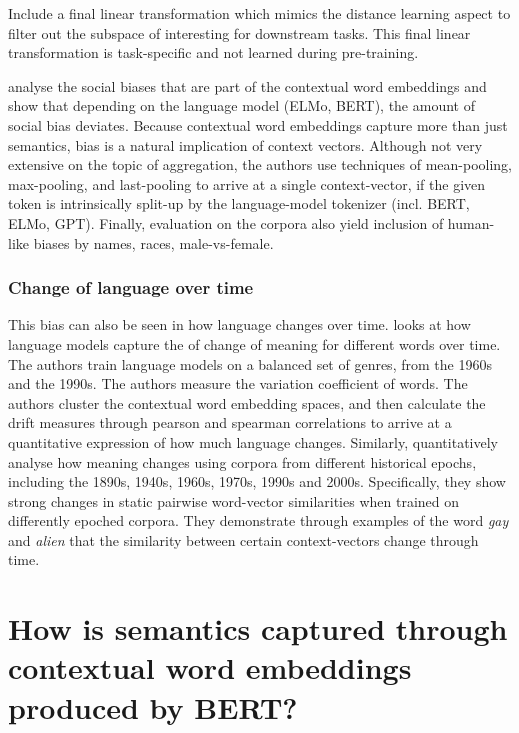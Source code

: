\documentclass[a4paper,12pt,oneside,openright]{report}
\begin{document}
\cite{moradshahi19} Include a final linear transformation which mimics the distance learning aspect to filter out the subspace of interesting for downstream tasks.
This final linear transformation is task-specific and not learned during pre-training.


\cite{may19} analyse the social biases that are part of the contextual word embeddings and show that depending on the language model (ELMo, BERT), the amount of social bias deviates. 
Because contextual word embeddings capture more than just semantics, bias is a natural implication of context vectors.
Although not very extensive on the topic of aggregation, the authors use techniques of mean-pooling, max-pooling, and last-pooling to arrive at a single context-vector, if the given token is intrinsically split-up by the language-model tokenizer (incl. BERT, ELMo, GPT).
Finally, evaluation on the corpora also yield inclusion of human-like biases \cite{jentzsch19} by names, races, male-vs-female. \\

\subsection{Change of language over time}

This bias can also be seen in how language changes over time. \cite{martinc20} looks at how language models capture the of change of meaning for different words over time.
The authors train language models on a balanced set of genres, from the 1960s and the 1990s.
The authors measure the variation coefficient of words.
The authors cluster the contextual word embedding spaces, and then calculate the drift measures through pearson and spearman correlations to arrive at a quantitative expression of how much language changes.
Similarly, \cite{hu19} quantitatively analyse how meaning changes using corpora from different historical epochs, including the 1890s, 1940s, 1960s, 1970s, 1990s and 2000s. 
Specifically, they show strong changes in static pairwise word-vector similarities when trained on differently epoched corpora.
They demonstrate through examples of the word \textit{gay} and \textit{alien} that the similarity between certain context-vectors change through time.

\chapter{How is semantics captured through contextual word embeddings produced by BERT?}\label{section:Understand_BERT}\label{section:UnderstandingBERT} 
\end{document}

